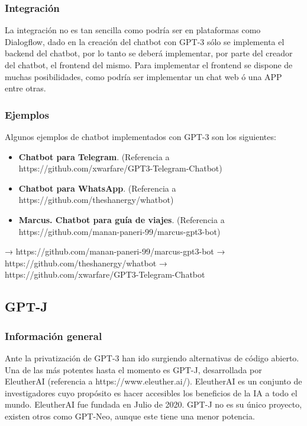 \subsubsection*{Integración}

La integración no es tan sencilla como podría ser en plataformas como Dialogflow, dado en la creación del chatbot con GPT-3 sólo se implementa el backend del chatbot, por lo tanto se deberá implementar, por parte del creador del chatbot, el frontend del mismo. Para implementar el frontend se dispone de muchas posibilidades, como podría ser implementar un chat web ó una APP entre otras.

\subsubsection*{Ejemplos}

Algunos ejemplos de chatbot implementados con GPT-3 son los siguientes:

\begin{itemize}
    \item \textbf{Chatbot para Telegram}. (Referencia a https://github.com/xwarfare/GPT3-Telegram-Chatbot)
    \item \textbf{Chatbot para WhatsApp}. (Referencia a https://github.com/theshanergy/whatbot)
    \item \textbf{Marcus. Chatbot para guía de viajes}. (Referencia a https://github.com/manan-paneri-99/marcus-gpt3-bot)
\end{itemize}



→ https://github.com/manan-paneri-99/marcus-gpt3-bot
→ https://github.com/theshanergy/whatbot
→ https://github.com/xwarfare/GPT3-Telegram-Chatbot


\subsection{GPT-J}

\subsubsection*{Información general}

Ante la privatización de GPT-3 han ido surgiendo alternativas de código abierto. Una de las más potentes hasta el momento es GPT-J, desarrollada por EleutherAI (referencia a https://www.eleuther.ai/). EleutherAI es un conjunto de investigadores cuyo propósito es hacer accesibles los beneficios de la IA a todo el mundo. EleutherAI fue fundada en Julio de 2020. GPT-J no es su único proyecto, existen otros como GPT-Neo, aunque este tiene una menor potencia.

